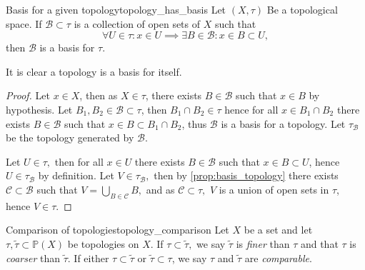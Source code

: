 \begin{proposition}{Basis for a given topology}{topology_has_basis}
    Let \((X, \tau)\) Be a topological space. If \(\mathcal{B} \subset \tau\) is a collection of open sets of \(X\) such that
    \begin{equation*}
        \forall U \in \tau : x \in U \implies \exists B \in \mathcal{B} : x \in B \subset U,
    \end{equation*}
    then \(\mathcal{B}\) is a basis for \(\tau\).
\end{proposition}
\begin{remark}
    It is clear a topology is a basis for itself.
\end{remark}
\begin{proof}
    Let \(x \in X\), then as \(X \in \tau\), there exists \(B \in \mathcal{B}\) such that \(x \in B\) by hypothesis. Let \(B_1, B_2 \in \mathcal{B} \subset \tau\), then \(B_1 \cap B_2 \in \tau\) hence for all \(x \in B_1 \cap B_2\) there exists \(B \in \mathcal{B}\) such that \(x \in B \subset B_1 \cap B_2\), thus \(\mathcal{B}\) is a basis for a topology. Let \(\tau_{\mathcal{B}}\) be the topology generated by \(\mathcal{B}.\)

    Let \(U \in \tau,\) then for all \(x \in U\) there exists \(B \in \mathcal{B}\) such that \(x \in B \subset U\), hence \(U \in \tau_{\mathcal{B}}\) by definition. Let \(V \in \tau_{\mathcal{B}},\) then by \cref{prop:basis_topology} there exists \(\mathcal{C} \subset \mathcal{B}\) such that \(V = \bigcup_{B \in \mathcal{C}}{B},\) and as \(\mathcal{C} \subset \tau,\) \(V\) is a union of open sets in \(\tau\), hence \(V \in \tau.\)
\end{proof}

\begin{definition}{Comparison of topologies}{topology_comparison}
    Let \(X\) be a set and let \(\tau, \tilde{\tau} \subset \mathbb{P}(X)\) be topologies on \(X\). If \(\tau \subset \tilde{\tau},\) we say \(\tilde{\tau}\) is \emph{finer} than \(\tau\) and that \(\tau\) is \emph{coarser} than \(\tilde{\tau}\). If either \(\tau \subset \tilde{\tau}\) or \(\tilde{\tau} \subset \tau\), we say \(\tau\) and \(\tilde{\tau}\) are \emph{comparable}.
\end{definition}

